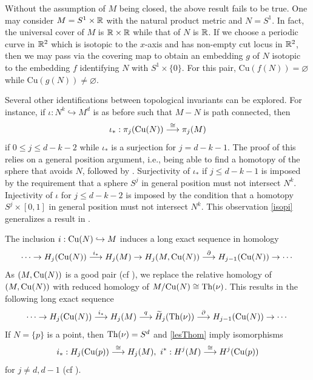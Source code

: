 \begin{rem}
    Without the assumption of $M$ being closed, the above result fails to be true. One may consider $M=S^1\times \mathbb{R}$ with the natural product metric and $N=S^1$. In fact, the universal cover of $M$ is $\mathbb{R}\times \mathbb{R}$ while that of $N$ is $\mathbb{R}$. If we choose a periodic curve in $\mathbb{R}^2$ which is isotopic to the $x$-axis and has non-empty cut locus in $\mathbb{R}^2$, then we may pass via the covering map to obtain an embedding $g$ of $N$ isotopic to the embedding $f$ identifying $N$ with $S^1\times \{0\}$. For this pair, $\mathrm{Cu}(f(N))=\varnothing$ while $\mathrm{Cu}(g(N))\neq \varnothing$.
\end{rem}

\hf Several other identifications between topological invariants can be explored. For instance, if $\iota:N^k\hookrightarrow M^d$ is as before such that $M-N$ is path connected, then 
\begin{equation}\label{isopi}
    \iota_\ast:\pi_j(\mathrm{Cu}(N))\stackrel{\cong}{\longrightarrow}\pi_j(M)
\end{equation}
if $0\leq j\leq d-k-2$ while $\iota_\ast$ is a surjection for $j=d-k-1$. The proof of this relies on a general position argument, i.e., being able to find a homotopy of the sphere that avoids $N$, followed by . Surjectivity of $\iota_\ast$ if $j\leq d-k-1$ is imposed by the requirement that a sphere $S^j$ in general position must not intersect $N^k$. Injectivity of $\iota$ for $j\leq d-k-2$ is imposed by the condition that a homotopy $S^j\times [0,1]$ in general position must not intersect $N^k$. This observation \eqref{isopi} generalizes a result in \cite[Proposition 4.5 (1)]{Sak96}.

\vspace{0.2cm}
\hf The inclusion $i:\mathrm{Cu}(N)\hookrightarrow M$ induces a long exact sequence in homology
\begin{displaymath}
    \cdots \to H_j(\mathrm{Cu}(N))\stackrel{i_\ast}{\longrightarrow} H_j(M)\to H_j(M,\mathrm{Cu}(N))\stackrel{\partial}{\longrightarrow} H_{j-1}(\mathrm{Cu}(N))\to \cdots
\end{displaymath}
As $(M,\mathrm{Cu}(N))$ is a good pair (cf ), we replace the relative homology of $(M,\mathrm{Cu}(N))$ with reduced homology of $M/\mathrm{Cu}(N)\cong \textup{Th}(\nu)$. This results in the following long exact sequence
\begin{equation}\label{lesThom}
    \cdots \to H_j(\mathrm{Cu}(N))\stackrel{i_\ast}{\longrightarrow} H_j(M)\stackrel{q}{\longrightarrow} \widetilde{H}_j(\textup{Th}(\nu))\stackrel{\partial}{\longrightarrow} H_{j-1}(\mathrm{Cu}(N))\to \cdots
\end{equation}
If $N=\{p\}$ is a point, then $\textup{Th}(\nu)=S^d$ and \eqref{lesThom} imply isomorphisms
\begin{displaymath}
    i_\ast:H_j(\textup{Cu}(p))\stackrel{\cong}{\longrightarrow} H_j(M),\,\,i^\ast:H^j(M)\stackrel{\cong}{\longrightarrow} H^j(\textup{Cu}(p))
\end{displaymath}
for $j\neq d,d-1$ (cf \cite[Proposition 4.5 (2)]{Sak96}). 

